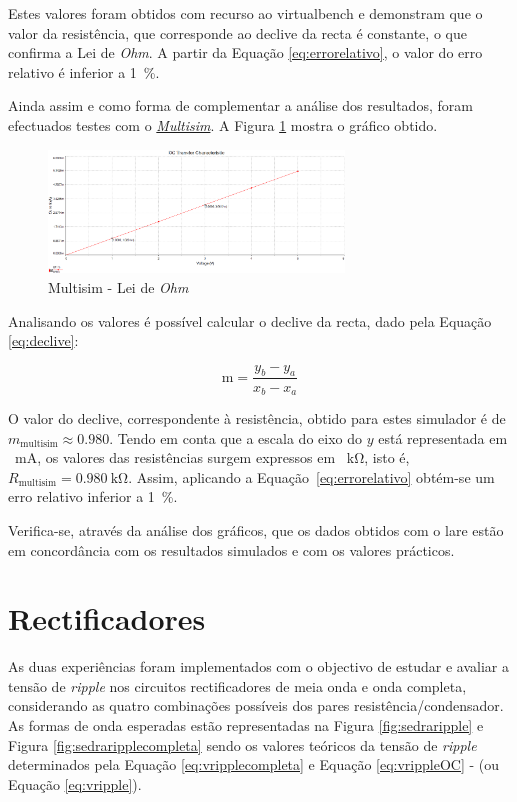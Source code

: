 Estes valores foram obtidos com recurso ao \acrshort{virtualbench} e demonstram que o valor da resistência, que corresponde ao declive da recta é constante, o que confirma a Lei de \textit{Ohm}. A partir da Equação \ref{eq:errorelativo}, o valor do erro relativo é inferior a \SI{1}{\percent}. 

Ainda assim e como forma de complementar a análise dos resultados, foram efectuados testes com o \href{https://www.multisim.com}{\textit{Multisim}}. A Figura \ref{fig:multisimOHM} mostra o gráfico obtido.

\begin{figure}[hbtp]
	\centering
	\includegraphics[width=0.7\textwidth]{figures/OHM_resultado_multisim.png}
	\caption{Multisim - Lei de \textit{Ohm}}
	\label{fig:multisimOHM}
\end{figure}

Analisando os valores é possível calcular o declive da recta, dado pela Equação \ref{eq:declive}:

\begin{equation} \label{eq:declive}
	\text{m} = \frac{y_{b} - y_{a}}{x_{b} - x_{a}}
\end{equation}

O valor do declive, correspondente à resistência, obtido para estes simulador é de $m_\text{{multisim}} \approx{0.980}$. Tendo em conta que a escala do eixo do $y$ está representada em \SI{}{\milli\ampere}, os valores das resistências surgem expressos em \SI{}{\kilo\ohm}, isto é, $R_\text{{multisim}} = \SI{0.980}{\kilo\ohm}$. Assim, aplicando a Equação~\ref{eq:errorelativo} obtém-se um erro relativo inferior a \SI{1}{\percent}.

Verifica-se, através da análise dos gráficos, que os dados obtidos com o \acrshort{lare} estão em concordância com os resultados simulados e com os valores prácticos.

\section{Rectificadores}
\label{sec:resultados_rectificadores}
As duas experiências foram implementados com o objectivo de estudar e avaliar a tensão de \textit{ripple} nos circuitos rectificadores de meia onda e onda completa, considerando as quatro combinações possíveis dos pares resistência/condensador. As formas de onda esperadas estão representadas na Figura \ref{fig:sedraripple} e Figura \ref{fig:sedraripplecompleta} sendo os valores teóricos da tensão de \textit{ripple} determinados pela Equação \ref{eq:vripplecompleta} e Equação \ref{eq:vrippleOC} - (ou Equação \ref{eq:vripple}). 

